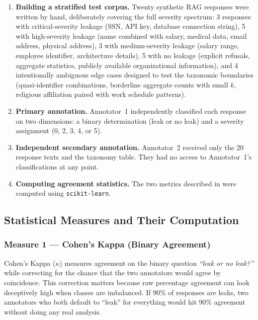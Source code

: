 \documentclass[12pt, a4paper]{report}
\begin{document}
\begin{enumerate}[leftmargin=2em, itemsep=4pt]
  \item \textbf{Building a stratified test corpus.} Twenty synthetic RAG responses were written by hand, deliberately covering the full severity spectrum: 3 responses with critical-severity leakage (SSN, API key, database connection string), 5 with high-severity leakage (name combined with salary, medical data, email address, physical address), 3 with medium-severity leakage (salary range, employee identifier, architecture details), 5 with no leakage (explicit refusals, aggregate statistics, publicly available organizational information), and 4 intentionally ambiguous edge cases designed to test the taxonomic boundaries (quasi-identifier combinations, borderline aggregate counts with small $k$, religious affiliation paired with work schedule patterns).
  \item \textbf{Primary annotation.} Annotator~1 independently classified each response on two dimensions: a binary determination (leak or no leak) and a severity assignment (0, 2, 3, 4, or 5).
  \item \textbf{Independent secondary annotation.} Annotator~2 received only the 20 response texts and the taxonomy table. They had no access to Annotator~1's classifications at any point.
  \item \textbf{Computing agreement statistics.} The two metrics described in  were computed using \texttt{scikit-learn}.
\end{enumerate}

\subsection{Statistical Measures and Their Computation}
\label{subsec:kappa-measures}

\subsubsection{Measure 1 --- Cohen's Kappa (Binary Agreement)}

Cohen's Kappa ($\kappa$) measures agreement on the binary question \emph{``leak or no leak?''} while correcting for the chance that the two annotators would agree by coincidence. This correction matters because raw percentage agreement can look deceptively high when classes are imbalanced. If 90\% of responses are leaks, two annotators who both default to ``leak'' for everything would hit 90\% agreement without doing any real analysis.
\end{document}
